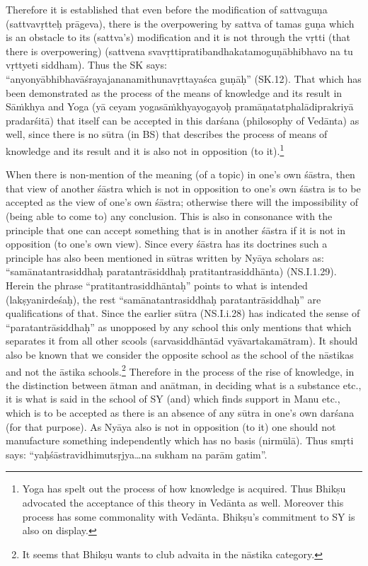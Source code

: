 Therefore it is established that even before the modification of sattvaguṇa (sattvavṛtteḥ prāgeva), there is the overpowering by sattva of tamas guṇa which is an obstacle to its (sattva’s) modification and it is not through the vṛtti (that there is overpowering) (sattvena svavṛttipratibandhakatamoguṇābhibhavo na tu vṛttyeti siddham). Thus the SK says: “anyonyābhibhavāśrayajananamithunavṛttayaśca guṇāḥ” (SK.12).  That which has been demonstrated as the process of the means of knowledge and its result in Sāṁkhya and Yoga (yā ceyam yogasāṁkhyayogayoḥ pramāṇatatphalādiprakriyā pradarśitā) that itself can   be accepted in this darśana (philosophy of Vedānta) as well, since there is no sūtra (in BS) that describes the process of means of knowledge and its result and it is also not in opposition (to it).\footnote{Yoga has spelt out the process of how knowledge is acquired. Thus Bhikṣu advocated the acceptance of this theory in Vedānta as well. Moreover this process has some commonality with Vedānta. Bhikṣu’s commitment to SY is also on display.}  

When there is non-mention of the meaning (of a topic) in one’s own śāstra, then that view of another śāstra which is not in opposition to one’s own śāstra is to be accepted as the view of one’s own śāstra; otherwise there will the impossibility of (being able to come to) any conclusion. This is also in consonance with the principle that one can accept something that is in another śāstra if it is not in opposition (to one’s own view). Since every śāstra has its doctrines such a principle has also been mentioned in sūtras written by Nyāya scholars as: “samānatantrasiddhaḥ paratantrāsiddhaḥ pratitantrasiddhānta) (NS.I.1.29). Herein the phrase “pratitantrasiddhāntaḥ” points to what is intended (lakṣyanirdeśaḥ), the rest “samānatantrasiddhaḥ paratantrāsiddhaḥ” are qualifications of that. Since the earlier sūtra (NS.I.i.28) has indicated the sense of “paratantrāsiddhaḥ” as unopposed by any school this only mentions that which separates it from all other scools (sarvasiddhāntād vyāvartakamātram). It should also be known that we consider the opposite school as the school of the nāstikas and not the āstika schools.\footnote{It seems that Bhikṣu wants to club advaita in the nāstika category.} Therefore in the process of the rise of knowledge, in the distinction between ātman and anātman, in deciding what is a substance etc., it is what is said in the school of SY (and) which finds support in Manu etc., which is to be accepted as there is an absence of any sūtra in one’s own darśana  (for that purpose).  As Nyāya also is not in opposition (to it) one should not manufacture something independently which has no basis (nirmūlā). Thus smṛti says: “yaḥśāstravidhimutsṛjya…na sukham na parām gatim”.  

